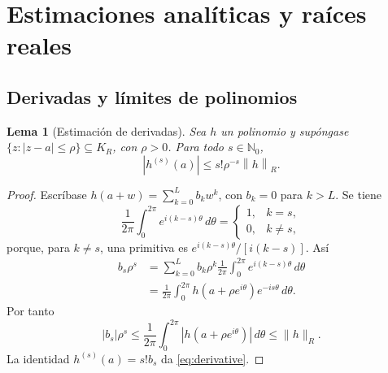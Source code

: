 \documentclass[11pt,a4paper]{article}
\numberwithin{equation}{section}
\newtheorem{lemma}[theorem]{Lema}
\theoremstyle{definition}
\theoremstyle{remark}
\newcommand{\Nn}{\mathbb N_0}
\newcommand{\norm}[1]{\left\lVert#1\right\rVert}
\begin{document}
\par
\bigskip

\section{Estimaciones analíticas y raíces reales}\label{sec:analytic}

\subsection{Derivadas y límites de polinomios}
\begin{lemma}[Estimación de derivadas]\label{lem:cauchy}
Sea $h$ un polinomio y supóngase $\{z:|z-a|\le\rho\}\subseteq K_R$, con $\rho>0$. Para todo $s\in\Nn$,
\begin{equation}\label{eq:derivative}
|h^{(s)}(a)|\le s!\rho^{-s}\norm h_R.
\end{equation}
\end{lemma}
\begin{proof}
Escríbase $h(a+w)=\sum_{k=0}^Lb_kw^k$, con $b_k=0$ para $k>L$. Se tiene
\[
\frac1{2\pi}\int_0^{2\pi}e^{i(k-s)\theta}\,d\theta
=\begin{cases}1,&k=s,\\0,&k\ne s,\end{cases}
\]
porque, para $k\ne s$, una primitiva es $e^{i(k-s)\theta}/[i(k-s)]$. Así
\begin{align*}
b_s\rho^s
&=\sum_{k=0}^Lb_k\rho^k\frac1{2\pi}\int_0^{2\pi}e^{i(k-s)\theta}\,d\theta\\
&=\frac1{2\pi}\int_0^{2\pi}h(a+\rho e^{i\theta})e^{-is\theta}\,d\theta.
\end{align*}
Por tanto
\[
|b_s|\rho^s\le\frac1{2\pi}\int_0^{2\pi}|h(a+\rho e^{i\theta})|\,d\theta\le\|h\|_R.
\]
La identidad $h^{(s)}(a)=s!b_s$ da \eqref{eq:derivative}.
\end{proof}
\end{document}
